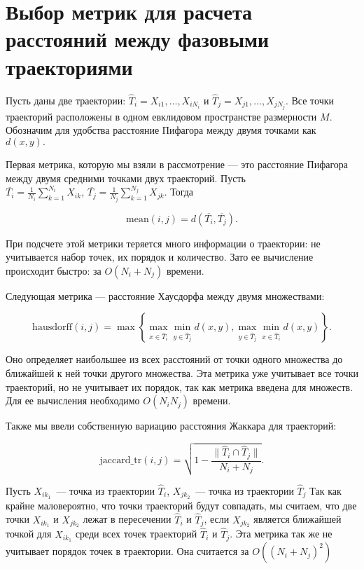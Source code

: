 \section{Выбор метрик для расчета расстояний между фазовыми траекториями}

Пусть даны две траектории: $\hat{T}_i = X_{i1},\ldots,X_{i N_i}$ и $\hat{T}_j = X_{j1},\ldots,X_{j N_j}$. Все точки траекторий расположены в одном евклидовом пространстве размерности $M$. Обозначим для удобства расстояние Пифагора между двумя точками как $d(x, y).$

Первая метрика, которую мы взяли в рассмотрение --- это расстояние Пифагора между двумя средними точками двух траекторий. Пусть\\ $\overline{T_i} = \frac{1}{N_i}\sum_{k=1}^{N_i} X_{ik}$, $\overline{T_j} = \frac{1}{N_j}\sum_{k=1}^{N_j} X_{jk}$. Тогда

$$\text{mean}(i, j) = d(\overline{T_i}, \overline{T_j}).$$

При подсчете этой метрики теряется много информации о траектории: не учитывается набор точек, их порядок и количество. Зато ее вычисление происходит быстро: за $O(N_i + N_j)$ времени.

Следующая метрика --- расстояние Хаусдорфа между двумя множествами:

$$\text{hausdorff}(i, j) = \max\left\{\max_{x\in\hat{T}_i} \min_{y\in\hat{T}_j} d(x, y), \max_{y\in\hat{T}_j} \min_{x\in\hat{T}_i} d(x, y)\right\}.$$

Оно определяет наибольшее из всех расстояний от точки одного множества до ближайшей к ней точки другого множества. Эта метрика уже учитывает все точки траекторий, но не учитывает их порядок, так как метрика введена для множеств. Для ее вычисления необходимо $O(N_iN_j)$ времени.

Также мы ввели собственную вариацию расстояния Жаккара для траекторий:

$$\text{jaccard\_tr}(i, j) = \sqrt{1 - \frac{\|\hat{T}_i \cap \hat{T}_j\|}{N_i + N_j}}.$$

Пусть $X_{ik_1}$~--- точка из траектории $\hat{T}_i$, $X_{jk_2}$~--- точка из траектории $\hat{T}_j$ Так как крайне маловероятно, что точки траекторий будут совпадать, мы считаем, что две точки $X_{ik_1}$ и $X_{jk_2}$ лежат в пересечении $\hat{T}_i$ и $\hat{T}_j$, если $X_{jk_2}$ является ближайшей точкой для $X_{ik_1}$ среди всех точек траекторий $\hat{T}_i$ и $\hat{T}_j$. Эта метрика так же не учитывает порядок точек в траектории. Она считается за $O((N_i + N_j)^2)$

